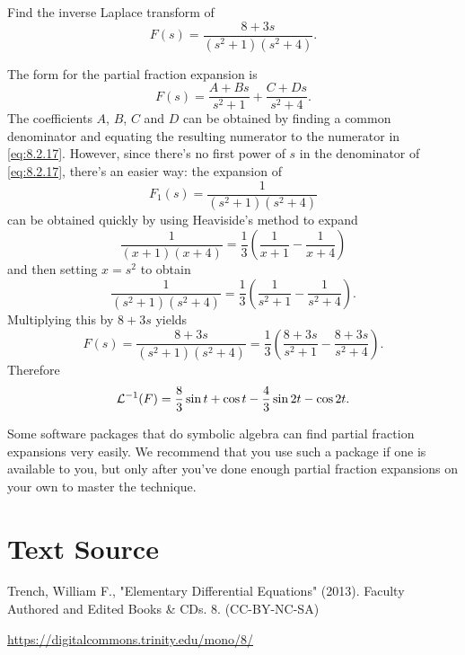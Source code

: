 \documentclass{ximera}
\begin{document}
\begin{example}\label{example:8.2.9}
Find the inverse Laplace transform of
\begin{equation}\label{eq:8.2.17}
F(s)=\frac{8+3s}{(s^2+1)(s^2+4)}.
\end{equation}
\begin{explanation}
The form for the partial fraction expansion is
$$
F(s)=\frac{A+Bs}{s^2+1}+\frac{C+Ds}{s^2+4}.
$$
The coefficients $A$, $B$, $C$ and $D$ can be obtained by finding a common
denominator and equating the resulting numerator to the numerator in
\eqref{eq:8.2.17}. However, since there's no first power of $s$ in the
denominator of \eqref{eq:8.2.17}, there's an easier way: the expansion of
$$
F_1(s)=\frac{1}{(s^2+1)(s^2+4)}
$$
can be obtained quickly by using Heaviside's method to expand
$$
\frac{1}{(x+1)(x+4)}=\frac{1}{3}\left(\frac{1}{x+1}-\frac{1}{x+4}\right)
$$
and then setting $x=s^2$ to obtain
$$
\frac{1}{(s^2+1)(s^2+4)}=\frac{1}{3}\left(\frac{1}{s^2+1}-\frac{1}{s^2+4}\right).
$$
Multiplying this by $8+3s$ yields
$$
F(s)=\frac{8+3s}{(s^2+1)(s^2+4)}=\frac{1}{3}\left(\frac{8+3s}{s^2+1}-\frac{8+3s}{s^2+4}\right).
$$
Therefore
$$
{\cal L}^{-1}(F)=\frac{8}{3}\sin t+\cos t-\frac{4}{3}\sin 2t-\cos 2t.
$$
\end{explanation}
\end{example}

Some software packages that do symbolic algebra can find partial
fraction expansions very easily. We recommend that you use such a
package if one is available to you, but only after you've  done
enough partial fraction expansions on your own to  master the
technique.



\section*{Text Source}
Trench, William F., "Elementary Differential Equations" (2013). Faculty Authored and Edited Books \& CDs. 8. (CC-BY-NC-SA)

\href{https://digitalcommons.trinity.edu/mono/8/}{https://digitalcommons.trinity.edu/mono/8/}
\end{document}
